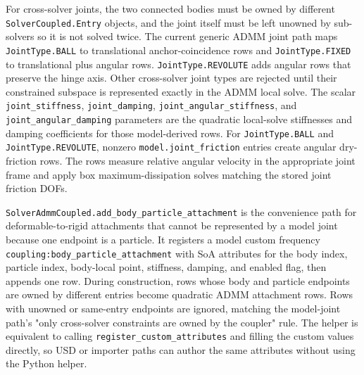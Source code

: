 \documentclass[11pt]{article}
\begin{document}
For cross-solver joints, the two connected bodies must be owned by different
\texttt{SolverCoupled.Entry} objects, and the joint itself must be left unowned
by sub-solvers so it is not solved twice. The current generic ADMM joint path
maps \texttt{JointType.BALL} to translational anchor-coincidence rows and
\texttt{JointType.FIXED} to translational plus angular rows.
\texttt{JointType.REVOLUTE} adds angular rows that preserve the hinge axis.
Other cross-solver joint types are rejected until their constrained subspace is
represented exactly in the ADMM local solve. The scalar \texttt{joint\_stiffness},
\texttt{joint\_damping}, \texttt{joint\_angular\_stiffness}, and
\texttt{joint\_angular\_damping} parameters are the quadratic local-solve
stiffnesses and damping coefficients for those model-derived rows.
For \texttt{JointType.BALL} and \texttt{JointType.REVOLUTE}, nonzero
\texttt{model.joint\_friction} entries create angular dry-friction rows.  The
rows measure relative angular velocity in the appropriate joint frame and apply
box maximum-dissipation solves matching the stored joint friction DOFs.

\texttt{SolverAdmmCoupled.add\_body\_particle\_attachment} is the convenience
path for deformable-to-rigid attachments that cannot be represented by a model
joint because one endpoint is a particle. It registers a model custom frequency
\texttt{coupling:body\_particle\_attachment} with SoA attributes for the body
index, particle index, body-local point, stiffness, damping, and enabled flag, then
appends one row. During construction, rows whose body and particle endpoints are
owned by different entries become quadratic ADMM attachment rows. Rows with
unowned or same-entry endpoints are ignored, matching the model-joint path's
"only cross-solver constraints are owned by the coupler" rule. The helper is
equivalent to calling \texttt{register\_custom\_attributes} and filling the
custom values directly, so USD or importer paths can author the same attributes
without using the Python helper.
\end{document}
